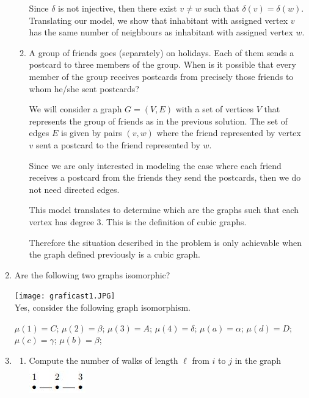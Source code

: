 \begin{enumerate}
\begin{enumerate}
        Since $\delta$ is not injective, then there exist $v\neq w$ such that $\delta(v) = \delta (w)$. Translating our model, we show that inhabitant with assigned vertex $v$ has the same number of neighbours as inhabitant with assigned vertex $w$.
        
        \item A group of friends goes (separately) on holidays. Each of them sends a postcard to three members of the group. When is it possible that every member of the group receives postcards from precisely those friends to whom he/she sent postcards?
        
        We will consider a graph $G = (V,E)$ with a set of vertices $V$ that represents the group of friends as in the previous solution. The set of edges $E$ is given by pairs $(v,w)$ where the friend represented by vertex $v$ sent a postcard to the friend represented by $w$.
        
        Since we are only interested in modeling the case where each friend receives a postcard from the friends they send the postcards, then we do not need directed edges.
        
        This model translates to determine which are the graphs such that each vertex has degree 3. This is the definition of cubic graphs.
        
        Therefore the situation described in the problem is only achievable when the graph defined previously is a cubic graph.
    \end{enumerate}
    
    \item Are the following two graphs isomorphic?
    
    \texttt{[image: graficast1.JPG]} \\
    
    Yes, consider the following graph isomorphism.
    
    $\mu(1) = C$;
    $\mu(2) = \beta$;
    $\mu(3) = A$;
    $\mu(4) = \delta$;
    $\mu(a)= \alpha$;
    $\mu(d)= D$;
    $\mu(c) = \gamma$;
    $\mu (b) =\beta$;
    
    \item 
        \begin{enumerate}
        \item Compute the number of walks of length $\ell$ from $i$ to $j$ in the graph \includegraphics{t3.JPG}
        

\end{enumerate}
\end{enumerate}

